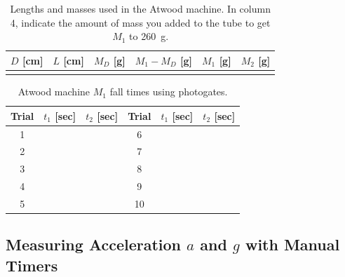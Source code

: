 \documentclass[addpoints]{physlabs}
\begin{document}
\begin{labsection}
\begin{experiment}
\begin{table}[ht]
    \centering
    \renewcommand{\arraystretch}{2.2}
    \captionsetup{font=normalsize}
    \caption{Lengths and masses used in the Atwood machine. In column 4, indicate the amount of mass you added to the tube to get $M_1$ to \qty{260}{\gram}. \label{tab: atwood data}}
    \begin{tabular}{|>{\centering\arraybackslash}p{1.6cm}|>{\centering\arraybackslash}p{1.6cm}|>{\centering\arraybackslash}p{1.6cm}|>{\centering\arraybackslash}p{1.6cm}|>{\centering\arraybackslash}p{1.6cm}|>{\centering\arraybackslash}p{1.6cm}|}
    \hline
    \rowcolor{gray!20}
    $D$ [cm] & $L$ [cm] & $M_D$ [g] & $M_1-M_D$ [g] & $M_1$ [g] & $M_2$ [g] \\
    \hline
             &          &           &               & 260       & 240       \\
    \hline
    \end{tabular}
\end{table}

\begin{table}[ht]
    \centering
    \renewcommand{\arraystretch}{2.2}
    \captionsetup{font=normalsize}
    \caption{Atwood machine $M_1$ fall times using photogates. \label{tab: photogate data}}
    \begin{tabular}{|c|>{\centering\arraybackslash}p{2cm}|>{\centering\arraybackslash}p{2cm}|c|>{\centering\arraybackslash}p{2cm}|>{\centering\arraybackslash}p{2cm}|}
    \hline
    \rowcolor{gray!20}
    Trial & $t_1$ [sec] & $t_2$ [sec] & Trial & $t_1$ [sec] & $t_2$ [sec] \\
    \hline
    1     &             &             & 6     &             &             \\
    \hline
    2     &             &             & 7     &             &             \\
    \hline
    3     &             &             & 8     &             &             \\
    \hline
    4     &             &             & 9     &             &             \\
    \hline
    5     &             &             & 10    &             &             \\
    \hline
    \end{tabular}
\end{table}

\subsection*{Measuring Acceleration $a$ and $g$ with Manual Timers}


\end{experiment}
\end{labsection}
\end{document}
